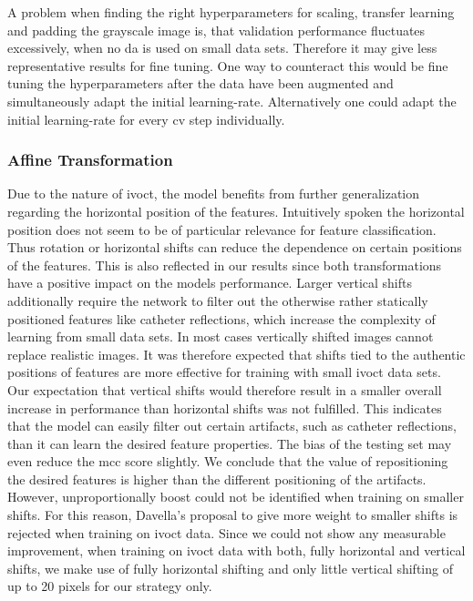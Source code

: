A problem when finding the right hyperparameters for scaling, transfer learning and padding the grayscale image is, that validation performance fluctuates excessively, when no \acrshort{da} is used on small data sets. Therefore it may give less representative results for fine tuning. One way to counteract this would be fine tuning the hyperparameters after the data have been augmented and simultaneously adapt the initial \gls{learning-rate}. Alternatively one could adapt the initial \gls{learning-rate} for every \acrshort{cv} step individually.

\subsubsection{Affine Transformation}

Due to the nature of \acrshort{ivoct}, the model benefits from further generalization regarding the horizontal position of the features. Intuitively spoken the horizontal position does not seem to be of particular relevance for feature classification. Thus rotation or horizontal shifts can reduce the dependence on certain positions of the features. This is also reflected in our results since both transformations have a positive impact on the models performance. Larger vertical shifts additionally require the network to filter out the otherwise rather statically positioned features like catheter reflections, which increase the complexity of learning from small data sets. In most cases vertically shifted images cannot replace realistic images. It was therefore expected that shifts tied to the authentic positions of features are more effective for training with small \acrshort{ivoct} data sets. Our expectation that vertical shifts would therefore result in a smaller overall increase in performance than horizontal shifts was not fulfilled. This indicates that the model can easily filter out certain artifacts, such as catheter reflections, than it can learn the desired feature properties. The bias of the testing set may even reduce the \acrshort{mcc} score slightly. We conclude that the value of repositioning the desired features is higher than the different positioning of the artifacts. However, unproportionally boost could not be identified when training on smaller shifts. For this reason, Davella's proposal to give more weight to smaller shifts \cite{Devalla.2018} is rejected when training on \acrshort{ivoct} data. Since we could not show any measurable improvement, when training on \acrshort{ivoct} data with both, fully horizontal and vertical shifts, we make use of fully horizontal shifting and only little vertical shifting of up to 20 pixels for our strategy only.

